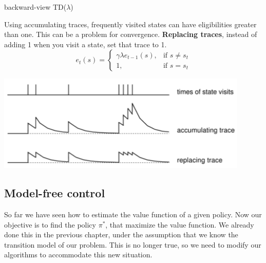 \documentclass[main.tex]{subfiles}
\begin{document}
\begin{algorithm}[H]
\SetAlgoLined
{}


\caption{backward-view TD($\lambda$)}
\end{algorithm}
\par
\noindent
Using accumulating traces, frequently visited states can have eligibilities greater than one. This can be a problem for convergence. \textbf{Replacing traces}, instead of adding 1 when you visit a state, set that trace to 1.
\begin{equation}
    e_t(s) = 
    \begin{cases}
        \gamma \lambda e_{t-1}(s),& \text{if }s \neq s_t\\
        1,& \text{if }s=s_t
    \end{cases}
\end{equation}
\begin{center}
    \includegraphics[width=120mm]{img/EligibilityTracesRepleacing.png}
\end{center}
\newpage

\subsection{Model-free control}
So far we have seen how to estimate the value function of a given policy. Now our objective is to find the policy $\pi^*$, that maximize the value function. We already done this in the previous chapter, under the assumption that we know the transition model of our problem. This is no longer true, so we need to modify our algorithms to accommodate this new situation.
\end{document}
